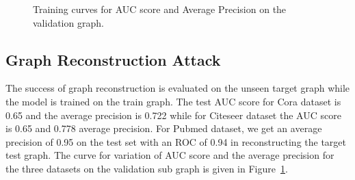 \begin{figure}[!htb]
    \centering
    \begin{minipage}[b]{1\linewidth}
    \centering
    \end{minipage}
    \caption{Training curves for AUC score and Average Precision on the validation graph.}
    \label{fig:valgraphrecon}
\end{figure}


\subsection{Graph Reconstruction Attack}

The success of graph reconstruction is evaluated on the unseen target graph while the model is trained on the train graph.
The test AUC score for Cora dataset is 0.65 and the average precision is 0.722 while for Citeseer dataset the AUC score is 0.65 and 0.778 average precision.
For Pubmed dataset, we get an average precision of 0.95 on the test set with an ROC of 0.94 in reconstructing the target test graph.
The curve for variation of AUC score and the average precision for the three datasets on the validation sub graph is given in Figure~\ref{fig:valgraphrecon}.



